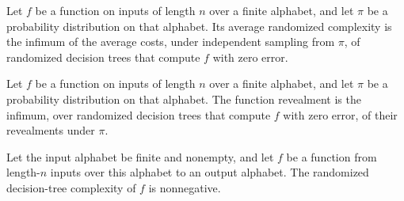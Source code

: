 \begin{definition}
\label{FABL.RandomizedDecisionTree.averageComplexity}
\leanok
{}
Let $f$ be a function on inputs of length $n$ over a finite alphabet, and let $\pi$ be a
probability distribution on that alphabet. Its average randomized complexity is the
infimum of the average costs, under independent sampling from $\pi$, of randomized
decision trees that compute $f$ with zero error.
\end{definition}

\begin{definition}
\label{FABL.RandomizedDecisionTree.functionRevealment}
\leanok
{}
Let $f$ be a function on inputs of length $n$ over a finite alphabet, and let $\pi$ be a
probability distribution on that alphabet. The function revealment is the infimum, over
randomized decision trees that compute $f$ with zero error, of their revealments under
$\pi$.
\end{definition}

\begin{theorem}
\label{FABL.RandomizedDecisionTree.complexity_nonneg}
\leanok
{}
Let the input alphabet be finite and nonempty, and let $f$ be a function from length-$n$
inputs over this alphabet to an output alphabet. The randomized decision-tree complexity
of $f$ is nonnegative.
\end{theorem}

